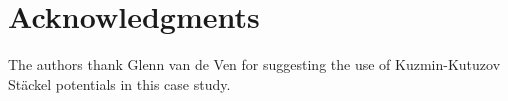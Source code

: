 \section{Acknowledgments}

The authors thank Glenn van de Ven for suggesting the use of Kuzmin-Kutuzov St\"{a}ckel potentials in this case study.
